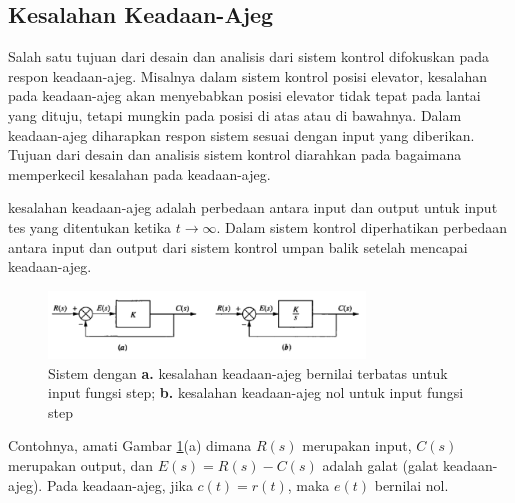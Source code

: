 \subsection{Kesalahan Keadaan-Ajeg}

Salah satu tujuan dari desain dan analisis dari sistem kontrol difokuskan pada respon keadaan-ajeg. Misalnya dalam sistem kontrol posisi elevator, kesalahan pada keadaan-ajeg akan menyebabkan posisi elevator tidak tepat pada lantai yang dituju, tetapi mungkin pada posisi di atas atau di bawahnya. Dalam keadaan-ajeg diharapkan respon sistem sesuai dengan input yang diberikan. Tujuan dari desain dan analisis sistem kontrol diarahkan pada bagaimana memperkecil kesalahan pada keadaan-ajeg.\cite{ControlSystemBook}

kesalahan keadaan-ajeg adalah perbedaan antara input dan output untuk input tes yang ditentukan ketika $t \rightarrow \infty$. Dalam sistem kontrol diperhatikan perbedaan antara input dan output dari sistem kontrol umpan balik setelah mencapai keadaan-ajeg. 


\begin{figure}[!h]
	\centering
	\includegraphics[width=0.75\textwidth]{figures/SSEExample}
	\caption{Sistem dengan \textbf{a.} kesalahan keadaan-ajeg bernilai terbatas untuk input fungsi step; \textbf{b.} kesalahan keadaan-ajeg nol untuk input fungsi step \cite{ControlSystemBook}}
	\label{fig:3:steadystateerror}
\end{figure}

Contohnya, amati Gambar \ref{fig:3:steadystateerror}(a) dimana $R(s)$ merupakan input, $C(s)$ merupakan output, dan $E(s) = R(s) - C(s)$ adalah galat (galat keadaan-ajeg). Pada keadaan-ajeg, jika $c(t) = r(t)$, maka $e(t)$ bernilai nol.

